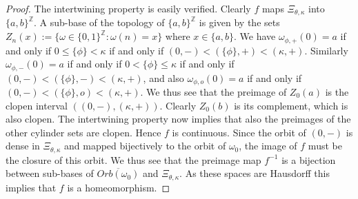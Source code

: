 \documentclass[11pt]{amsart}
\newcommand{\Z}{\mathbb{Z}}
\newcommand{\cut}{\kappa}
\begin{document}
\begin{proof}
	The intertwining property is easily verified.
Clearly $f$ maps $\Xi_{\theta, \cut}$ into $\{a,b\}^\Z$. A sub-base of the topology of $\{a,b\}^\Z$ is given by the sets  $Z_n(x) := \{\omega\in \{0,1\}^\Z:\omega(n) = x\}$ where $x\in \{a,b\}$. We have 
	$\omega_{\phi,+}(0)=a$ if and only if $0\leq \{\phi\} <\cut$ if and only if 
	$(0,-)<(\{\phi\},+) < (\cut,+)$. Similarly $\omega_{\phi,-}(0)=a$ if and only if $0< \{\phi\} \leq \cut$ if and only if 
	$(0,-)<(\{\phi\},-) < (\cut,+)$, and also $\omega_{\phi,o}(0)=a$ if and only if $(0,-)<(\{\phi\},o) < (\cut,+)$. We thus see that the preimage of $Z_0(a)$ is the clopen interval $((0,-),(\cut,+))$. Clearly $Z_0(b)$ is its complement, which is also clopen. The intertwining property now implies that also the preimages of the other cylinder sets are clopen. Hence $f$ is continuous. Since the orbit of $(0,-)$ is dense in $\Xi_{\theta, \cut}$ and mapped bijectively to the orbit of $\omega_0$, the image of $f$ must be the closure of this orbit. We thus see that the preimage map $f^{-1}$ is a bijection between sub-bases of $\overline{Orb(\omega_0)}$ and $\Xi_{\theta, \cut}$. As these spaces are Hausdorff this implies that $f$ is a homeomorphism.  
\end{proof}
\end{document}
